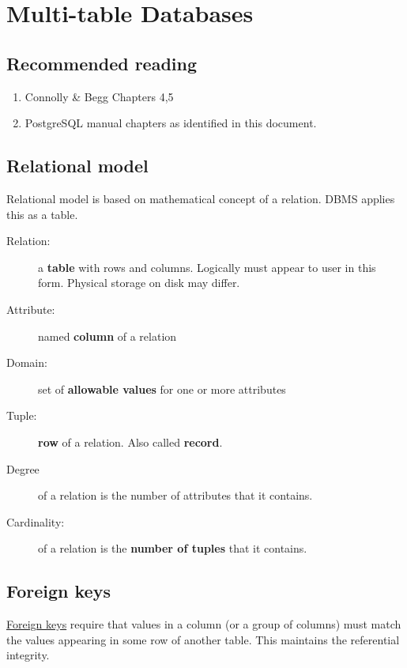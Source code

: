 \chapter{Multi-table Databases}
\label{ch:multi-table-databases}

\section{Recommended reading}

\begin{enumerate}
\item
  Connolly \& Begg Chapters 4,5
\item
  PostgreSQL manual chapters as identified in this document.
\end{enumerate}

\section{Relational model}\label{relational-model}

Relational model is based on mathematical concept of a relation. DBMS
applies this as a table.

\begin{description}
\item[Relation:]
a \textbf{table} with rows and columns. Logically must appear to user in
this form. Physical storage on disk may differ.
\item[Attribute:]
named \textbf{column} of a relation
\item[Domain:]
set of \textbf{allowable values} for one or more attributes
\item[Tuple:]
\textbf{row} of a relation. Also called \textbf{record}.
\item[Degree]
of a relation is the number of attributes that it contains.
\item[Cardinality:]
of a relation is the \textbf{number of tuples} that it contains.
\end{description}

\section{Foreign keys}\label{foreign-keys}

\href{https://www.postgresql.org/docs/13/ddl-constraints.html\#DDL-CONSTRAINTS-FK}{Foreign
keys} require that values in a column (or a group of columns) must match
the values appearing in some row of another table. This maintains the
referential integrity.

